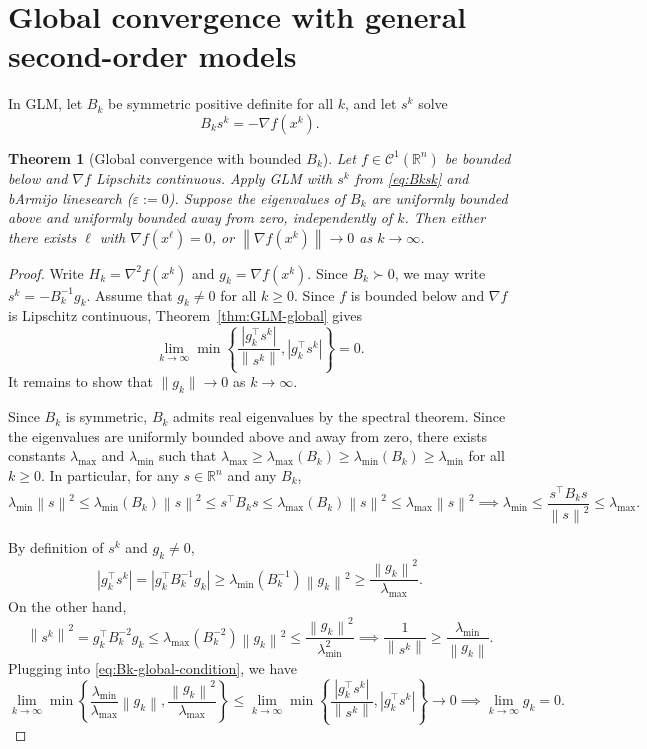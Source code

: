 \documentclass[11pt,a4paper]{report}
\theoremstyle{plain}
\newtheorem{theorem}{Theorem}[chapter]
\theoremstyle{definition}
\newcommand{\R}{\mathbb{R}}
\newcommand{\norm}[1]{\left\lVert#1\right\rVert}
\newcommand{\grad}{\nabla}
\newcommand{\hess}{\nabla^{2}}
\newcommand{\trans}{^{\top}}
\newcommand{\eps}{\varepsilon}
\begin{document}
\section{Global convergence with general second-order models}

In GLM, let $B_{k}$ be symmetric positive definite for all $k$, and let $s^{k}$
solve
\begin{equation}\label{eq:Bksk}
B_{k}s^{k}=-\grad f(x^{k}).
\end{equation}

\begin{theorem}[Global convergence with bounded $B_{k}$]\label{thm:Bk-global}
Let $f\in\mathcal{C}^{1}(\R^{n})$ be bounded below and $\grad f$ Lipschitz continuous. Apply GLM with $s^{k}$ from \eqref{eq:Bksk} and bArmijo linesearch
($\eps:=0$). Suppose the eigenvalues of $B_{k}$ are uniformly bounded above and
uniformly bounded away from zero, independently of $k$. Then either there exists
$\ell$ with $\grad f(x^{\ell})=0$, or $\norm{\grad f(x^{k})}\to 0$ as $k\to\infty$.
\end{theorem}
\begin{proof}
  Write $H_k = \hess f(x^{k})$ and $g_k = \grad f(x^{k})$. Since $B_k \succ 0$, we may write $s^{k} = -B_k^{-1}g_k$. Assume that $g_k \neq 0$ for all $k \geq 0$. Since $f$ is bounded below and $\grad f$ is Lipschitz continuous, Theorem~\ref{thm:GLM-global} gives
  \begin{equation}\label{eq:Bk-global-condition}
    \lim_{k\to\infty}\min\!\left\{\frac{|g_k\trans s^{k}|}{\norm{s^{k}}}, |g_k\trans s^{k}|\right\}=0.
  \end{equation}
  It remains to show that $\|g_k\| \to 0$ as $k \to \infty$.

  Since $B_k$ is symmetric, $B_k$ admits real eigenvalues by the spectral theorem. Since the eigenvalues are uniformly bounded above and away from zero, there exists constants $\lambda_{\max}$ and $\lambda_{\min}$ such that $\lambda_{\max} \geq \lambda_{\max}(B_k) \geq \lambda_{\min}(B_k) \geq \lambda_{\min}$ for all $k \geq 0$. In particular, for any $s \in \R^n$ and any $B_k$,
  \[
    \lambda_{\min} \norm{s}^2 \leq \lambda_{\min}(B_k) \norm{s}^2 \leq s\trans B_k s \leq \lambda_{\max}(B_k) \norm{s}^2 \leq \lambda_{\max} \norm{s}^2 \implies \lambda_{\min} \leq \frac{s\trans B_k s}{\norm{s}^2} \leq \lambda_{\max}.
  \]

  By definition of $s^{k}$ and $g_k \neq 0$, 
  \[
    |g_k\trans s^{k}| = |g_k\trans B_k^{-1}g_k| \geq \lambda_{\min}(B_k^{-1}) \norm{g_k}^2 \geq \frac{\norm{g_k}^2}{\lambda_{\max}}.
  \]
  On the other hand,
  \[
    \norm{s^{k}}^2 = g_k\trans B_k^{-2}g_k \leq \lambda_{\max}(B_k^{-2})\norm{g_k}^2 \leq \frac{\norm{g_k}^2}{\lambda_{\min}^2} \implies \frac{1}{\norm{s^{k}}} \geq \frac{\lambda_{\min}}{\norm{g_k}}.
  \]
  Plugging into \eqref{eq:Bk-global-condition}, we have
  \[
    \lim_{k\to\infty} \min\!\left\{\frac{\lambda_{\min}}{\lambda_{\max}} \norm{g_k}, \frac{\norm{g_k}^2}{\lambda_{\max}}\right\} \leq \lim_{k\to\infty}\min\!\left\{\frac{|g_k\trans s^{k}|}{\norm{s^{k}}}, |g_k\trans s^{k}|\right\} \to 0 \implies \lim_{k \to \infty} g_k = 0.
  \]
\end{proof}
\end{document}
